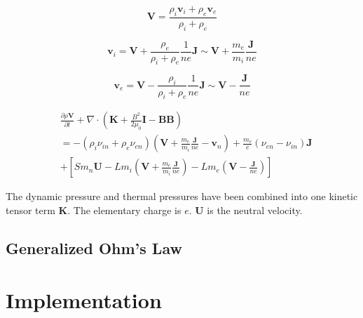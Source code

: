 \documentclass[12pt,upcase]{umlthesis}
\begin{document}
\begin{equation}
	\textbf{V} = \frac{\rho_i \textbf{v}_i + \rho_e \textbf{v}_e}{\rho_i+\rho_e}
\end{equation}

\begin{equation}
	\textbf{v}_i = \textbf{V} + \frac{\rho_e}{\rho_i+\rho_e} \frac{1}{n e} \textbf{J} \sim \textbf{V} + \frac{m_e}{m_i} \frac{\textbf{J}}{n e} 
\end{equation}

\begin{equation}
	\textbf{v}_e = \textbf{V} - \frac{\rho_i}{\rho_i+\rho_e} \frac{1}{n e} \textbf{J} \sim \textbf{V} -\frac{\textbf{J} }{n e}
\end{equation}

\begin{equation}\label{eq:momentumcom}
\begin{aligned}
	&\frac{\partial \rho \textbf{V}}{\partial t} + \nabla \cdot (\textbf{K} + \frac{B^2}{2\mu_0}\textbf{I} - \textbf{BB}) \\
	&= - (\rho_i \nu_{in} + \rho_e \nu_{en})(\textbf{V} + \frac{m_e}{m_i} \frac{\textbf{J}}{n e} - \textbf{v}_n) + \frac{m_e}{e}(\nu_{en}-\nu_{in}) \textbf{J} \\
	& + [S m_n \textbf{U} - L m_i (\textbf{V} + \frac{m_e}{m_i} \frac{\textbf{J}}{n e})- L m_e (\textbf{V} -\frac{\textbf{J}}{n e})]
\end{aligned}
\end{equation}

The dynamic pressure and thermal pressures have been combined into one kinetic tensor term $\textbf{K}$. The elementary charge is $e$. $\textbf{U}$ is the neutral velocity.

\section{Generalized Ohm's Law}\label{sec:ohmslaw}


\chapter{Implementation}\label{chap:implementation}
\end{document}
